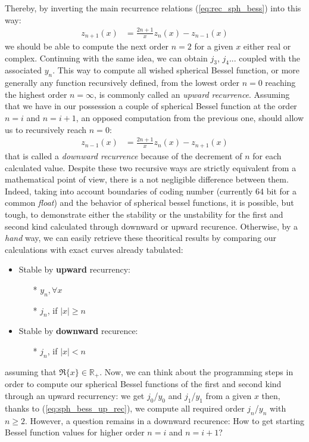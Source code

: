 \documentclass{article}
\numberwithin{equation}{section}
\begin{document}
Thereby, by inverting the main recurrence relations (\ref{eq:rec_sph_bess}) into this way:
\begin{align}\label{eq:sph_bess_up_rec}
z_{n+1}(x) &= \frac{2n+1}{x}z_{n}(x) - z_{n-1}(x)
\end{align}
we should be able to compute the next order $n=2$ for a given $x$ either real or complex. Continuing with the same idea, we can obtain $j_{3}$, $j_{4}$... coupled with the associated $y_{n}$. This way to compute all wished spherical Bessel function, or more generally any function recursively defined, from the lowest order $n=0$ reaching the highest order $n=\infty$, is commonly called an \textit{upward recurrence}. Assuming that we have in our possession a couple of spherical Bessel function at the order $n=i$ and $n=i+1$, an opposed computation from the previous one, should allow us to recursively reach $n=0$: 
\begin{align}\label{eq:sph_bess_down_rec}
z_{n-1}(x) &= \frac{2n+1}{x}z_{n}(x) - z_{n+1}(x)
\end{align}
that is called a \textit{downward recurrence} because of the decrement of $n$ for each calculated value. Despite these two recursive ways are strictly equivalent from a mathematical point of view, there is a not negligible difference between them. Indeed, taking into account boundaries of coding number (currently 64 bit for a common \textit{float}) and the behavior of spherical bessel functions, it is possible, but tough, to demonstrate either the stability or the unstability for the first and second kind calculated through downward or upward recurence. Otherwise, by a \textit{hand} way, we can easily retrieve these theoritical results by comparing our calculations with exact curves already tabulated:
\begin{itemize}
\item Stable by \textbf{upward} recurrency: 
\begin{itemize}
\item[*]$y_{n}, \forall x$
\item[*]$j_{n}$, if $|x| \geqslant n$
\end{itemize}
\item Stable by \textbf{downward} recurence:
\begin{itemize}
\item[*]$j_{n}$, if $|x| < n$
\end{itemize}
\end{itemize}
assuming that $\Re\{x\} \in\mathbb{R}_{+}$. Now, we can think about the programming steps in order to compute our spherical Bessel functions of the first and second kind through an upward recurrency: we get $j_{0}$/$y_{0}$ and $j_{1}$/$y_{1}$ from a given $x$ then, thanks to (\ref{eq:sph_bess_up_rec}), we compute all required order $j_{n}$/$y_{n}$ with $n \geqslant 2$. However, a question remains in a downward recurence: How to get starting Bessel function values for higher order $n=i$ and $n=i+1$?
\end{document}
